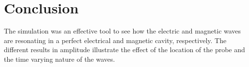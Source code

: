 \section{Conclusion}\label{sec:conclusion}
The simulation was an effective tool to see how the electric and magnetic waves are resonating in a perfect electrical and magnetic cavity, respectively. The different results in amplitude illustrate the effect of the location of the probe and the time varying nature of the waves. 
